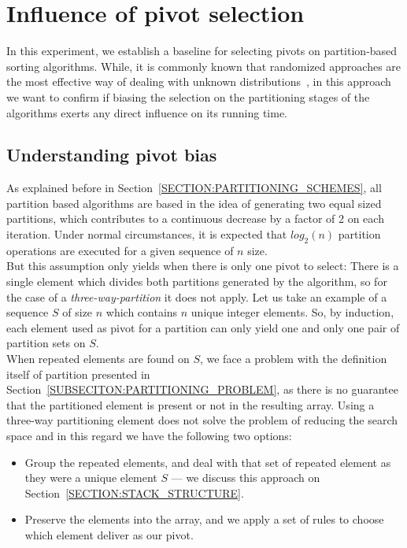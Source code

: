 \section{Influence of pivot selection}

In this experiment, we establish a baseline for selecting pivots on partition-based sorting algorithms. While, it is commonly known that randomized approaches are the most effective way of dealing with unknown distributions~\cite{estivil92}, in this approach we want to confirm if biasing the selection on the partitioning stages of the algorithms exerts any direct influence on its running time.\\

\subsection{Understanding pivot bias}

As explained before in Section~\ref{SECTION:PARTITIONING_SCHEMES}, all partition based algorithms are based in the idea of generating two equal sized partitions, which contributes to a continuous decrease by a factor of 2 on each iteration. Under normal circumstances, it is expected that $log_2(n)$ partition operations are executed for a given sequence of $n$ size.\\

But this assumption only yields when there is only one pivot to select: There is a single element which divides both partitions generated by the algorithm, so for the case of a \emph{three-way-partition} it does not apply. Let us take an example of a sequence $S$ of size $n$ which contains $n$ unique integer elements. So, by induction, each element used as pivot for a partition can only yield one and only one pair of partition sets on $S$.\\

When repeated elements are found on $S$, we face a problem with the definition itself of partition presented in Section~\ref{SUBSECITON:PARTITIONING_PROBLEM}, as there is no guarantee that the partitioned element is present or not in the resulting array. Using a three-way partitioning element does not solve the problem of reducing the search space and in this regard we have the following two options:

\begin{itemize}
    \item Group the repeated elements, and deal with that set of repeated element as they were a unique element $S$ --- we discuss this approach on Section~\ref{SECTION:STACK_STRUCTURE}.
    \item Preserve the elements into the array, and we apply a set of rules to choose which element deliver as our pivot.
\end{itemize}


